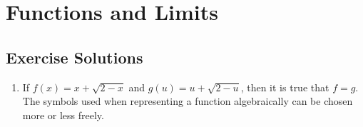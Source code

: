 \documentclass[10pt]{article}
\begin{document}
\section{Functions and Limits}
\subsection{Exercise Solutions}

\begin{enumerate}

\item If \(f(x) = x + \sqrt{2 - x}\) and \(g(u) = u + \sqrt{2 - u}\), then it is true that \(f = g\). The symbols used when representing a function algebraically can be chosen more or less freely.

\end{enumerate}
\end{document}
